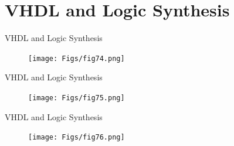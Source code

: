 \documentclass[aspectratio=169]{beamer}
\begin{document}
%	
%	
%	
%
%	
%	
\section{VHDL and Logic Synthesis}
\begin{frame}{VHDL and Logic Synthesis}
	\justifying
	
	
	\begin{figure}[h]
		\centering
		\texttt{[image: Figs/fig74.png]}
	\end{figure}
	
\end{frame}
\begin{frame}{VHDL and Logic Synthesis}
	\justifying
	
	
	\begin{figure}[h]
		\centering
		\texttt{[image: Figs/fig75.png]}
	\end{figure}
	
\end{frame}
\begin{frame}{VHDL and Logic Synthesis}
	\justifying
	
	
	\begin{figure}[h]
		\centering
		\texttt{[image: Figs/fig76.png]}
	\end{figure}
	
\end{frame}
\end{document}
